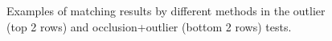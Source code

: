 \documentclass[11pt,bezier,]{article}
\begin{document}
\begin{figure}[ht]


 


  \caption{
Examples of   matching results by different methods in the outlier (top 2 rows) 
and  occlusion+outlier (bottom 2 rows) tests.
  \label{3D_nonrotate_exa}}
    \end{figure}
      
\end{document}
